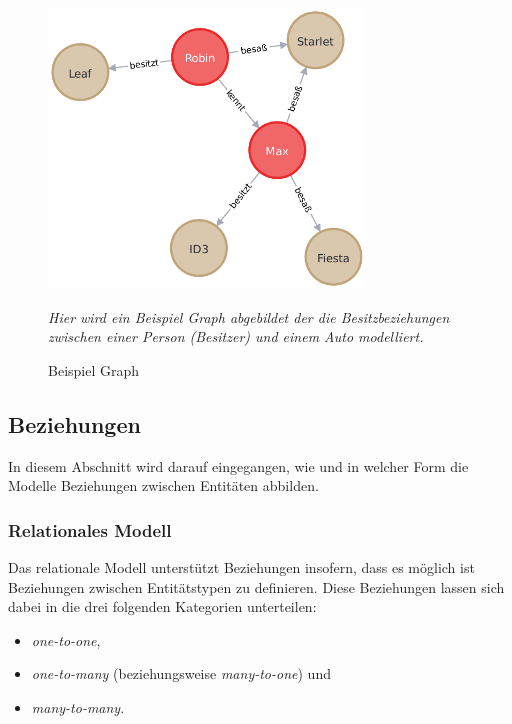 \begin{figure}[ht]
    \centering
    \includegraphics[width=0.75\textwidth]{images/example_graph.pdf}
    \caption{Beispiel Graph}
    \vspace{1em}
    \textit{Hier wird ein Beispiel Graph abgebildet der die Besitzbeziehungen zwischen einer Person (Besitzer) und einem Auto modelliert.}
    \label{fig:beispiel_graph}
\end{figure}

\subsection{Beziehungen}
\label{datenmodelle:beziehungen}
In diesem Abschnitt wird darauf eingegangen, wie und in welcher Form die Modelle Beziehungen zwischen Entitäten abbilden. 

\subsubsection{Relationales Modell}
Das relationale Modell unterstützt Beziehungen insofern, dass es möglich ist Beziehungen zwischen Entitätstypen zu definieren. Diese Beziehungen lassen sich dabei in die drei folgenden Kategorien unterteilen: 
\begin{itemize}
    \item \textit{one-to-one}, 
    \item \textit{one-to-many} (beziehungsweise \textit{many-to-one}) und 
    \item \textit{many-to-many}.
\end{itemize}

